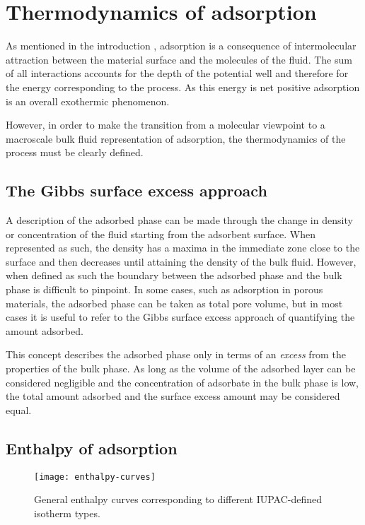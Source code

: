 
\section{Thermodynamics of adsorption}

As mentioned in the introduction , adsorption 
is a consequence of intermolecular attraction between the 
material surface and the molecules of the fluid. The sum of 
all interactions accounts for the depth of the potential 
well and therefore for the energy corresponding to the 
process. As this energy is net positive adsorption is an
overall exothermic phenomenon.

However, in order to make the transition from a molecular 
viewpoint to a macroscale bulk fluid representation of 
adsorption, the thermodynamics of the process must be 
clearly defined.

\subsection{The Gibbs surface excess approach}

A description of the adsorbed phase can be made through the change
in density or concentration of the fluid starting from the 
adsorbent surface. When represented as such, the density 
has a maxima in the immediate zone close to the surface and then
decreases until attaining the density of the bulk fluid.
However, when defined as such the boundary between the 
adsorbed phase and the bulk phase is difficult to pinpoint.
In some cases, such as adsorption in porous materials, the 
adsorbed phase can be taken as total pore volume, but in 
most cases it is useful to refer to the Gibbs surface 
excess approach of quantifying the amount adsorbed.

This concept describes the adsorbed phase only in terms
of an \textit{excess} from the properties of the bulk phase. 
As long as the volume of the adsorbed layer can be considered 
negligible and the concentration of adsorbate in the bulk 
phase is low, the total amount adsorbed and the surface excess
amount may be considered equal.

\subsection{Enthalpy of adsorption}

\begin{figure}[htb]
    \centering

    \texttt{[image: enthalpy-curves]}
    \caption{
      General enthalpy curves corresponding to different 
      IUPAC-defined isotherm 
      types\cite{llewellynGasAdsorptionMicrocalorimetry2005}.
    }%
    \label{calo:fig:enthalpy-iupac-iso}

\end{figure}


\subsection{}